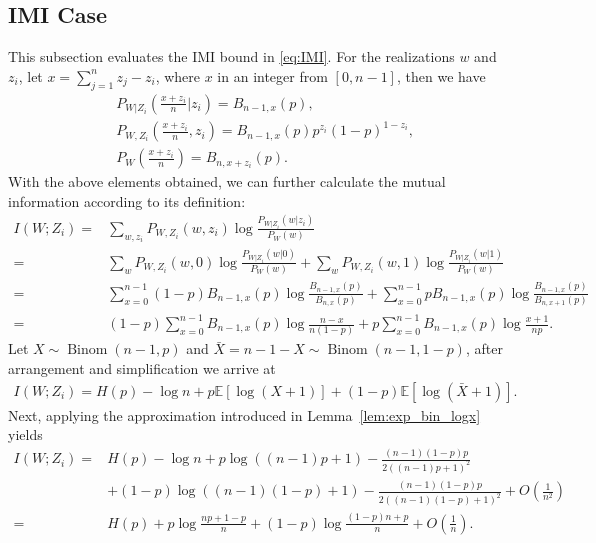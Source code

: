 \documentclass[onecolumn,romanappendices,10pt]{IEEEtran}
\newcommand{\EE}{{\mathbb{E}}}
\DeclareMathOperator{\Binomial}{Binom}
\begin{document}
	\subsection{IMI Case} \label{subapp:cal_IMI}
	This subsection evaluates the IMI bound in \eqref{eq:IMI}. For the realizations $w$ and $z_i$, let $x = \sum_{j=1}^{n} z_j - z_i$, where $x$ in an integer from $[0, n - 1]$, then we have
	\begin{align}
		&P_{W | Z_i}(\frac{x + z_i}{n} | z_i) = B_{n-1,x}(p), \\
		&P_{W, Z_i}(\frac{x + z_i}{n}, z_i) = B_{n-1,x}(p) p^{z_i} (1-p)^{1-z_i}, \\
		&P_{W}(\frac{x + z_i}{n}) = B_{n, x + z_i}(p).
	\end{align}
	With the above elements obtained, we can further calculate the mutual information according to its definition:
	\begin{equation}
		\begin{aligned}
			I\left( W; Z_i \right) =& \sum_{w, z_i} P_{W, Z_i}(w, z_i) \log \frac{P_{W | Z_i}(w | z_i)}{P_{W}(w)} \\
			=& \sum_{w} P_{W, Z_i}(w, 0) \log \frac{P_{W | Z_i}(w | 0)}{P_{W}(w)} + \sum_{w} P_{W, Z_i}(w, 1) \log \frac{P_{W | Z_i}(w | 1)}{P_{W}(w)} \\
			=& \sum_{x=0}^{n-1} (1-p) B_{n-1,x}(p) \log \frac{B_{n-1,x}(p)}{B_{n,x}(p)} + \sum_{x=0}^{n-1} p B_{n-1,x}(p) \log \frac{B_{n-1,x}(p)}{B_{n,x+1}(p)} \\
			=& (1 - p) \sum_{x=0}^{n-1} B_{n-1,x}(p) \log \frac{n - x}{n (1 - p)} + p \sum_{x=0}^{n-1} B_{n-1,x}(p) \log \frac{x + 1}{n p}.
		\end{aligned}
	\end{equation}
	Let $X \sim \Binomial(n - 1, p)$ and $\bar{X} = n - 1 - X \sim \Binomial(n - 1, 1 - p)$, after arrangement and simplification we arrive at
	\begin{equation}
		\begin{aligned}
			I\left( W; Z_i \right) = H(p) - \log n + p \EE \left[ \log (X + 1) \right] + (1 - p) \EE \left[ \log (\bar{X} + 1) \right].
		\end{aligned}\label{eq:Ber_IMI}
	\end{equation}
	Next, applying the approximation introduced in Lemma~\ref{lem:exp_bin_logx} yields
	\begin{equation}
		\begin{aligned}
			I\left( W; Z_i \right) =& H(p) - \log n + p \log ((n - 1) p + 1) - \frac{(n - 1) (1 - p) p}{2 \left( (n - 1) p + 1 \right)^2} \\
			&+ (1 - p) \log ((n - 1) (1 - p) + 1) - \frac{(n - 1) (1 - p) p}{2 \left( (n - 1) (1 - p) + 1 \right)^2} + O\left(\frac{1}{n^2}\right) \\
			=& H(p) + p \log \frac{np + 1 - p}{n} + (1 - p) \log \frac{(1 - p) n + p}{n} + O\left( \frac{1}{n} \right).
		\end{aligned}
	\end{equation}
\end{document}
